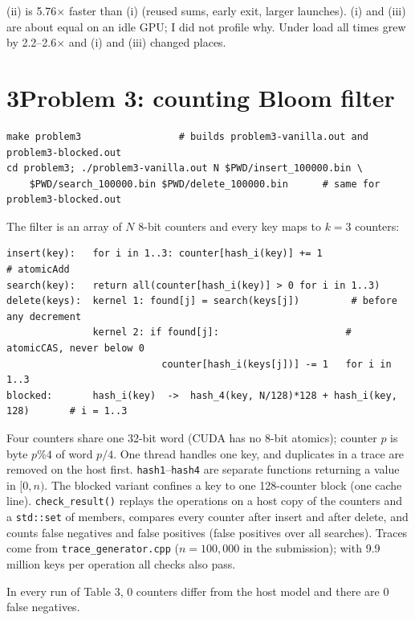\documentclass[11pt]{article}
\begin{document}
(ii) is 5.76$\times$ faster than (i) (reused sums, early exit, larger launches).
(i) and (iii) are about equal on an idle GPU; I did not profile why. Under
load all times grew by 2.2--2.6$\times$ and (i) and (iii) changed places.

\section*{3\quad Problem 3: counting Bloom filter}
\begin{Verbatim}[frame=single,fontsize=\footnotesize]
make problem3                 # builds problem3-vanilla.out and problem3-blocked.out
cd problem3; ./problem3-vanilla.out N $PWD/insert_100000.bin \
    $PWD/search_100000.bin $PWD/delete_100000.bin      # same for problem3-blocked.out
\end{Verbatim}
The filter is an array of $N$ 8-bit counters and every key maps to $k=3$ counters:
\begin{Verbatim}[frame=single,fontsize=\footnotesize]
insert(key):   for i in 1..3: counter[hash_i(key)] += 1                  # atomicAdd
search(key):   return all(counter[hash_i(key)] > 0 for i in 1..3)
delete(keys):  kernel 1: found[j] = search(keys[j])         # before any decrement
               kernel 2: if found[j]:                      # atomicCAS, never below 0
                           counter[hash_i(keys[j])] -= 1   for i in 1..3
blocked:       hash_i(key)  ->  hash_4(key, N/128)*128 + hash_i(key, 128)       # i = 1..3
\end{Verbatim}
Four counters share one 32-bit word (CUDA has no 8-bit atomics); counter $p$ is
byte $p\%4$ of word $p/4$. One thread handles one key, and duplicates in a
trace are removed on the host first. \texttt{hash1}--\texttt{hash4} are separate
functions returning a value in $[0,n)$. The blocked variant confines a key to
one 128-counter block (one cache line).
\texttt{check\_result()} replays the operations on a host copy of the counters
and a \texttt{std::set} of members, compares every counter after insert and
after delete, and counts false negatives and false positives (false positives
over all searches). Traces come from \texttt{trace\_generator.cpp}
($n=100{,}000$ in the submission); with 9.9 million keys per operation all
checks also pass.

In every run of Table 3, 0 counters differ from the host model and there are 0
false negatives.
\end{document}
